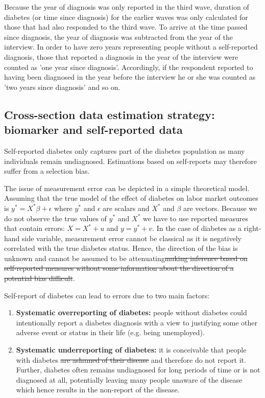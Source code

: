 \documentclass[12pt,english,british]{article}
\providecommand{\DIFaddtex}[1]{{\protect\color{blue}\uwave{#1}}} %
\providecommand{\DIFdeltex}[1]{{\protect\color{red}\sout{#1}}}                      %
\providecommand{\DIFaddbegin}{} %
\providecommand{\DIFaddend}{} %
\providecommand{\DIFdelbegin}{} %
\providecommand{\DIFdelend}{} %
\providecommand{\DIFadd}[1]{\texorpdfstring{\DIFaddtex{#1}}{#1}} %
\providecommand{\DIFdel}[1]{\texorpdfstring{\DIFdeltex{#1}}{}} %
\begin{document}
Because the year of diagnosis was only reported in the third wave,
duration of diabetes (or time since diagnosis)
for the earlier waves was only calculated for those that had also responded to the third
wave. To arrive at the time passed since diagnosis, the year of diagnosis
was subtracted from the year of the interview. In order to have zero years representing people without a self-reported  diagnosis, those that reported
a diagnosis in the year of the interview were counted as 'one year
since diagnosis'. Accordingly, if the respondent reported to having
been diagnosed in the year before the interview he or she was counted
as 'two years since diagnosis' and so on.

\subsection{Cross-section data estimation strategy: biomarker and self-reported data}

Self-reported diabetes only captures part of the diabetes population as many individuals remain undiagnosed.  Estimations based on self-reports may therefore suffer from a selection bias.

The issue of measurement error can be depicted in a simple theoretical model. Assuming that the true model of the effect of diabetes on labor market outcomes is $y^{*}=X^{*}\beta+\epsilon$ where $y^{*}$ and $\epsilon$ are scalars and $X^{*}$ and $\beta$ are vectors. Because we do not observe the true values of $y^{*}$ and $X^{*}$  we have to use reported measures that contain errors: $X=X^{*} + u$ and $y=y^{*} + v$. In the case of diabetes as a right-hand side variable, measurement error cannot be classical as it is negatively correlated with the true diabetes status. Hence, the direction of the bias is unknown and cannot be assumed to be attenuating\DIFdelbegin \DIFdel{making inference based on self-reported measures without some information about the direction of a potential bias difficult}\DIFdelend .

Self-report of diabetes can lead to errors due to two main factors: 
\begin{enumerate}
\item \textbf{Systematic overreporting of diabetes:} people without diabetes
could intentionally report a diabetes diagnosis with a view to justifying
some other adverse event or status in their life (e.g. being unemployed). 
\item \textbf{Systematic underreporting of diabetes:} it is conceivable
that people with diabetes \DIFdelbegin \DIFdel{are ashamed of their disease }\DIFdelend \DIFaddbegin \DIFadd{feel bad about suffering from the condition }\DIFaddend and therefore
do not report it. Further, diabetes often remains
undiagnosed for long periods of time or is not diagnosed at all, potentially
leaving many people unaware of the disease which hence results in
the non-report of the disease.
\end{enumerate} 
\end{document}
